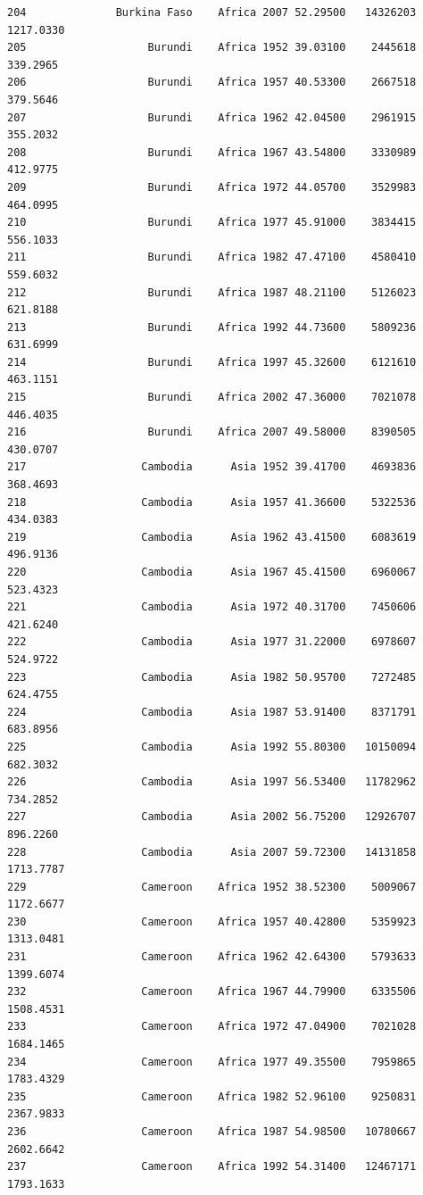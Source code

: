 \documentclass[
  letterpaper,
  DIV=11,
  numbers=noendperiod]{scrreprt}
\begin{document}
\begin{verbatim}
204              Burkina Faso    Africa 2007 52.29500   14326203   1217.0330
205                   Burundi    Africa 1952 39.03100    2445618    339.2965
206                   Burundi    Africa 1957 40.53300    2667518    379.5646
207                   Burundi    Africa 1962 42.04500    2961915    355.2032
208                   Burundi    Africa 1967 43.54800    3330989    412.9775
209                   Burundi    Africa 1972 44.05700    3529983    464.0995
210                   Burundi    Africa 1977 45.91000    3834415    556.1033
211                   Burundi    Africa 1982 47.47100    4580410    559.6032
212                   Burundi    Africa 1987 48.21100    5126023    621.8188
213                   Burundi    Africa 1992 44.73600    5809236    631.6999
214                   Burundi    Africa 1997 45.32600    6121610    463.1151
215                   Burundi    Africa 2002 47.36000    7021078    446.4035
216                   Burundi    Africa 2007 49.58000    8390505    430.0707
217                  Cambodia      Asia 1952 39.41700    4693836    368.4693
218                  Cambodia      Asia 1957 41.36600    5322536    434.0383
219                  Cambodia      Asia 1962 43.41500    6083619    496.9136
220                  Cambodia      Asia 1967 45.41500    6960067    523.4323
221                  Cambodia      Asia 1972 40.31700    7450606    421.6240
222                  Cambodia      Asia 1977 31.22000    6978607    524.9722
223                  Cambodia      Asia 1982 50.95700    7272485    624.4755
224                  Cambodia      Asia 1987 53.91400    8371791    683.8956
225                  Cambodia      Asia 1992 55.80300   10150094    682.3032
226                  Cambodia      Asia 1997 56.53400   11782962    734.2852
227                  Cambodia      Asia 2002 56.75200   12926707    896.2260
228                  Cambodia      Asia 2007 59.72300   14131858   1713.7787
229                  Cameroon    Africa 1952 38.52300    5009067   1172.6677
230                  Cameroon    Africa 1957 40.42800    5359923   1313.0481
231                  Cameroon    Africa 1962 42.64300    5793633   1399.6074
232                  Cameroon    Africa 1967 44.79900    6335506   1508.4531
233                  Cameroon    Africa 1972 47.04900    7021028   1684.1465
234                  Cameroon    Africa 1977 49.35500    7959865   1783.4329
235                  Cameroon    Africa 1982 52.96100    9250831   2367.9833
236                  Cameroon    Africa 1987 54.98500   10780667   2602.6642
237                  Cameroon    Africa 1992 54.31400   12467171   1793.1633

\end{verbatim}
\end{document}
